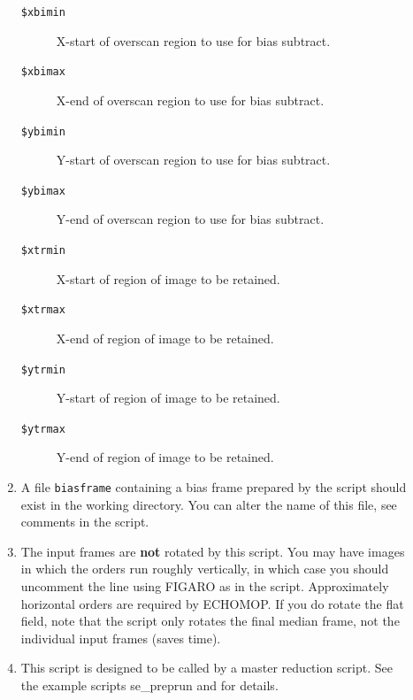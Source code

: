 \documentclass[twoside,11pt]{starlink}
\begin{document}
\begin{description}
\begin{enumerate}
\begin{description}

\item [{\tt{\$xbimin}}]
           X-start of overscan region to use for bias subtract.

\item [{\tt{\$xbimax}}]
           X-end of overscan region to use for bias subtract.

\item [{\tt{\$ybimin}}]
           Y-start of overscan region to use for bias subtract.

\item [{\tt{\$ybimax}}]
           Y-end of overscan region to use for bias subtract.

\item [{\tt{\$xtrmin}}]
           X-start of region of image to be retained.

\item [{\tt{\$xtrmax}}]
           X-end of region of image to be retained.

\item [{\tt{\$ytrmin}}]
           Y-start of region of image to be retained.

\item [{\tt{\$ytrmax}}]
           Y-end of region of image to be retained.


\end{description}

\item A file \verb+biasframe+ containing a bias frame prepared by the
      script  should exist in the
      working directory.
      You can alter the name of this file, see comments in the
      script.

\item The input frames are \textbf{not} rotated by this script.  You may
      have images in which the orders run roughly vertically,
      in which case you should uncomment the line using FIGARO
       as in the script.  Approximately
      horizontal orders
      are required by ECHOMOP.  If you do rotate the flat field,
      note that the script only rotates the final median frame,
      not the individual input frames (saves time).

\item This script is designed to be called by a master reduction
      script.  See the example scripts 
      {se_preprun}
      and  for details.

\end{enumerate}
\end{description}
\end{document}
